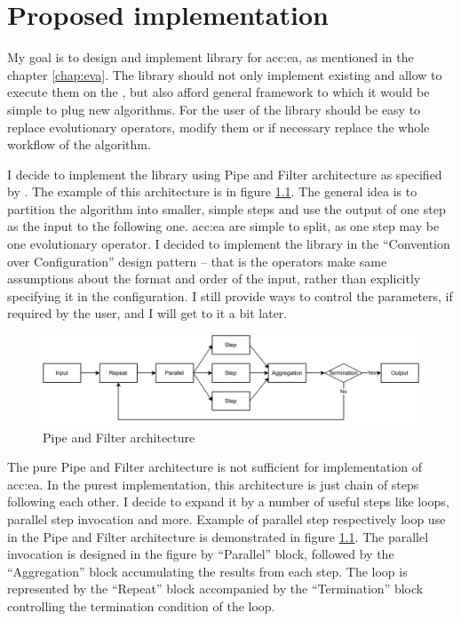 \chapter{Proposed implementation}
\label{chap:impl}

My goal is to design and implement library for \acrlong{acc:ea}, as mentioned in the chapter \ref{chap:eva}. The library should not only implement existing  and allow to execute them on the \gpuns, but also afford general framework to which it would be simple to plug new algorithms. For the user of the library should be easy to replace evolutionary operators, modify them or if necessary replace the whole workflow of the algorithm.

I decide to implement the library using Pipe and Filter architecture as specified by \citet{EnterpriseIntegrationPatterns}. The example of this architecture is in figure \ref{fig:pipesandfilters}. The general idea is to partition the algorithm into smaller, simple steps and use the output of one step as the input to the following one. \acrshort{acc:ea} are simple to split, as one step may be one evolutionary operator. I decided to implement the library in the \enquote{Convention over Configuration} design pattern -- that is the operators make same assumptions about the format and order of the input, rather than explicitly specifying it in the configuration. I still provide ways to control the parameters, if required by the user, and I will get to it a bit later.

\begin{figure}
    \centering
    \includegraphics[width=\textwidth]{img/PipesAndFilters.pdf}
    \caption{Pipe and Filter architecture}
    \label{fig:pipesandfilters}
\end{figure}

The pure Pipe and Filter architecture is not sufficient for implementation of \acrshort{acc:ea}. In the purest implementation, this architecture is just chain of steps following each other. I decide to expand it by a number of useful steps like loops, parallel step invocation and more. Example of parallel step respectively loop use in the Pipe and Filter architecture is demonstrated in figure \ref{fig:pipesandfilters}. The parallel invocation is designed in the figure by \enquote{Parallel} block, followed by the \enquote{Aggregation} block accumulating the results from each step. The loop is represented by the \enquote{Repeat} block accompanied by the \enquote{Termination} block controlling the termination condition of the loop.

